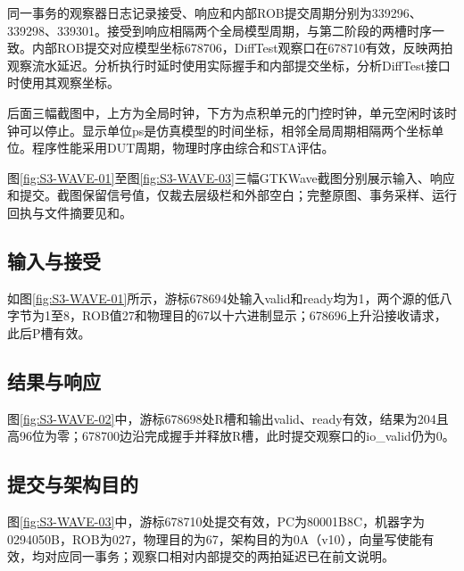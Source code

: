 同一事务的观察器日志记录接受、响应和内部ROB提交周期分别为339296、339298、339301。接受到响应相隔两个全局模型周期，与第二阶段的两槽时序一致。内部ROB提交对应模型坐标678706，DiffTest观察口在678710有效，反映两拍观察流水延迟。分析执行时延时使用实际握手和内部提交坐标，分析DiffTest接口时使用其观察坐标。

后面三幅截图中，上方为全局时钟，下方为点积单元的门控时钟，单元空闲时该时钟可以停止。显示单位ps是仿真模型的时间坐标，相邻全局周期相隔两个坐标单位。程序性能采用DUT周期，物理时序由综合和STA评估。

图\ref{fig:S3-WAVE-01}至图\ref{fig:S3-WAVE-03}三幅GTKWave截图分别展示输入、响应和提交。截图保留信号值，仅裁去层级栏和外部空白；完整原图、事务采样、运行回执与文件摘要见和。

\subsection{输入与接受}
如图\ref{fig:S3-WAVE-01}所示，游标678694处输入valid和ready均为1，两个源的低八字节为1至8，ROB值27和物理目的67以十六进制显示；678696上升沿接收请求，此后P槽有效。

\subsection{结果与响应}
图\ref{fig:S3-WAVE-02}中，游标678698处R槽和输出valid、ready有效，结果为204且高96位为零；678700边沿完成握手并释放R槽，此时提交观察口的io\_valid仍为0。

\subsection{提交与架构目的}
图\ref{fig:S3-WAVE-03}中，游标678710处提交有效，PC为80001B8C，机器字为0294050B，ROB为027，物理目的为67，架构目的为0A（v10），向量写使能有效，均对应同一事务；观察口相对内部提交的两拍延迟已在前文说明。
